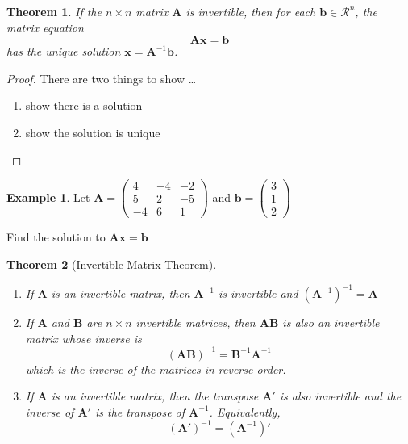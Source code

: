 \documentclass[
]{book}
\newtheorem{theorem}{Theorem}[chapter]
\theoremstyle{definition}
\theoremstyle{definition}
\newtheorem{example}{Example}[chapter]
\theoremstyle{definition}
\theoremstyle{definition}
\theoremstyle{remark}
\begin{document}
\begin{theorem}
If the \(n \times n\) matrix \(\mathbf{A}\) is invertible, then for each \(\mathbf{b} \in \mathcal{R}^n\), the matrix equation
\[
\mathbf{A} \mathbf{x} = \mathbf{b}
\]
has the unique solution \(\mathbf{x} = \mathbf{A}^{-1} \mathbf{b}\).
\end{theorem}

\begin{proof}

There are two things to show \ldots{}

\begin{enumerate}
\def\labelenumi{\arabic{enumi})}
\item
  show there is a solution
\item
  show the solution is unique
\end{enumerate}

\end{proof}

\begin{example}
Let \(\mathbf{A} = \begin{pmatrix} 4 & -4 & -2 \\ 5 & 2 & -5 \\ -4 & 6 & 1 \end{pmatrix}\) and \(\mathbf{b} = \begin{pmatrix} 3 \\ 1 \\ 2 \end{pmatrix}\)

Find the solution to \(\mathbf{A} \mathbf{x} = \mathbf{b}\)
\end{example}

\begin{theorem}[Invertible Matrix Theorem]
\protect\hypertarget{thm:invertible-matrix1}{}\label{thm:invertible-matrix1}

\begin{enumerate}
\def\labelenumi{\arabic{enumi})}
\item
  If \(\mathbf{A}\) is an invertible matrix, then \(\mathbf{A}^{-1}\) is invertible and \((\mathbf{A}^{-1})^{-1} = \mathbf{A}\)
\item
  If \(\mathbf{A}\) and \(\mathbf{B}\) are \(n \times n\) invertible matrices, then \(\mathbf{A} \mathbf{B}\) is also an invertible matrix whose inverse is
  \[
  (\mathbf{A}\mathbf{B})^{-1} = \mathbf{B}^{-1}\mathbf{A}^{-1}
  \]
  which is the inverse of the matrices in reverse order.
\item
  If \(\mathbf{A}\) is an invertible matrix, then the transpose \(\mathbf{A}'\) is also invertible and the inverse of \(\mathbf{A}'\) is the transpose of \(\mathbf{A}^{-1}\). Equivalently,
  \[
  (\mathbf{A}')^{-1} = (\mathbf{A}^{-1})'
  \]
\end{enumerate}

\end{theorem}
\end{document}
